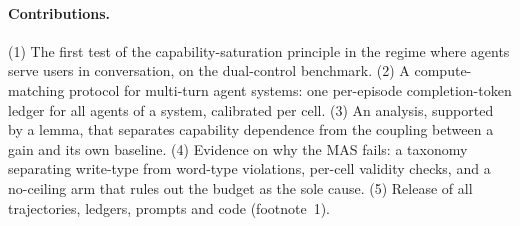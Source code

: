 \paragraph{Contributions.} (1) The first test of the capability-saturation principle in the regime where agents serve users in conversation, on the dual-control benchmark. (2) A compute-matching protocol for multi-turn agent systems: one per-episode completion-token ledger for all agents of a system, calibrated per cell. (3) An analysis, supported by a lemma, that separates capability dependence from the coupling between a gain and its own baseline. (4) Evidence on why the MAS fails: a taxonomy separating write-type from word-type violations, per-cell validity checks, and a no-ceiling arm that rules out the budget as the sole cause. (5) Release of all trajectories, ledgers, prompts and code (footnote~1).
